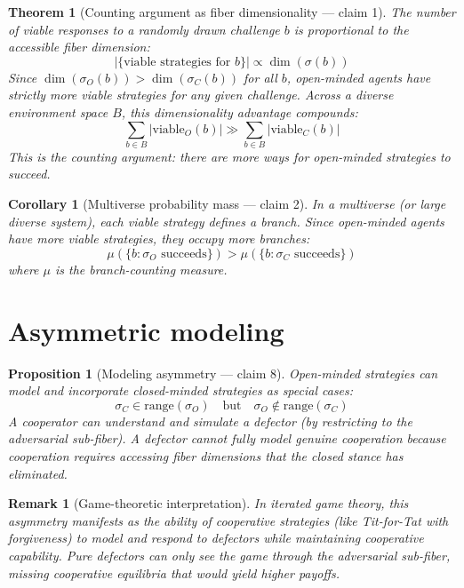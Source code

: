 \documentclass[11pt,a4paper]{article}
\newtheorem{theorem}[definition]{Theorem}
\newtheorem{proposition}[definition]{Proposition}
\newtheorem{corollary}[definition]{Corollary}
\newtheorem{remark}[definition]{Remark}
\begin{document}
\begin{theorem}[Counting argument as fiber dimensionality --- claim 1]
\label{thm:counting}
The number of viable responses to a randomly drawn challenge $b$ is
proportional to the accessible fiber dimension:
\[
  |\{\text{viable strategies for } b\}| \propto \dim(\sigma(b))
\]
Since $\dim(\sigma_O(b)) > \dim(\sigma_C(b))$ for all $b$, open-minded
agents have strictly more viable strategies for any given challenge.
Across a diverse environment space $B$, this dimensionality advantage
compounds:
\[
  \sum_{b \in B} |\text{viable}_O(b)| \gg \sum_{b \in B} |\text{viable}_C(b)|
\]
This is the counting argument: there are \emph{more ways} for open-minded
strategies to succeed.
\end{theorem}

\begin{corollary}[Multiverse probability mass --- claim 2]
In a multiverse (or large diverse system), each viable strategy defines
a branch. Since open-minded agents have more viable strategies, they
occupy more branches:
\[
  \mu(\{b : \sigma_O \text{ succeeds}\}) > \mu(\{b : \sigma_C \text{ succeeds}\})
\]
where $\mu$ is the branch-counting measure.
\end{corollary}

\section{Asymmetric modeling}
\label{sec:asymmetric}

\begin{proposition}[Modeling asymmetry --- claim 8]
\label{prop:asymmetry}
Open-minded strategies can model and incorporate closed-minded strategies
as special cases:
\[
  \sigma_C \in \text{range}(\sigma_O) \quad \text{but} \quad
  \sigma_O \notin \text{range}(\sigma_C)
\]
A cooperator can understand and simulate a defector (by restricting to
the adversarial sub-fiber). A defector cannot fully model genuine
cooperation because cooperation requires accessing fiber dimensions
that the closed stance has eliminated.
\end{proposition}

\begin{remark}[Game-theoretic interpretation]
In iterated game theory, this asymmetry manifests as the ability of
cooperative strategies (like Tit-for-Tat with forgiveness) to model
and respond to defectors while maintaining cooperative capability.
Pure defectors can only see the game through the adversarial sub-fiber,
missing cooperative equilibria that would yield higher payoffs.
\end{remark}
\end{document}
